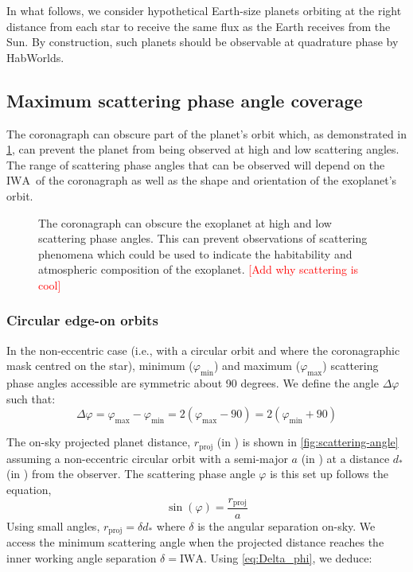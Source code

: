 \documentclass[
    usenatbib,
]{mnras}
\newcommand{\todo}[1]{\textcolor{red}{[#1]}}
\newcommand{\IWA}{\ensuremath{\mathrm{IWA}}}
\begin{document}
In what follows, we consider hypothetical Earth-size planets orbiting at the right distance from each star to receive the same flux as the Earth receives from the Sun. By construction, such planets should be observable at quadrature phase by HabWorlds. 


\subsection{Maximum scattering phase angle coverage}
\label{sec:Delta_phi}

The coronagraph can obscure part of the planet's orbit which, as demonstrated in \cref{fig:annotated-orbit}, can prevent the planet from being observed at high and low scattering angles. 
%
The range of scattering phase angles that can be observed will depend on the \IWA\ of the coronagraph as well as the shape and orientation of the exoplanet's orbit.

\begin{figure}
    \centering
    
    \caption{
        The coronagraph can obscure the exoplanet at high and low scattering phase angles. This can prevent observations of scattering phenomena which could be used to indicate the habitability and atmospheric composition of the exoplanet. \todo{Add why scattering is cool} 
    }
    \label{fig:annotated-orbit}
\end{figure}


\subsubsection{Circular edge-on orbits}

In the non-eccentric case (i.e., with a circular orbit and where the coronagraphic mask centred on the star), minimum ($\varphi_\mathrm{min}$) and maximum ($\varphi_\mathrm{max}$) scattering phase angles accessible are symmetric about 90 degrees. 
%
We define the angle $\Delta \varphi$ such that: 
\begin{equation}
    \label{eq:Delta_phi}
    \Delta \varphi 
    = \varphi_\mathrm{max} - \varphi_\mathrm{min}
    =  2(\varphi_\mathrm{max} - 90) 
    =  2(\varphi_\mathrm{min} + 90)
\end{equation}

The on-sky projected planet distance, $r_\mathrm{proj}$ (in \si{\au}) is shown in \cref{fig:scattering-angle} assuming a non-eccentric circular orbit with a semi-major $a$ (in \si{\au}) at a distance $d_*$ (in \si{\parsec}) from the observer. 
%
The scattering phase angle $\varphi$ is this set up follows the equation,
\begin{equation}
    \sin(\varphi) = \frac{r_\mathrm{proj}}{a}
\end{equation}
%
Using small angles, $r_\mathrm{proj} = \delta d_*$ where $\delta$ is the angular separation on-sky.
%
We access the minimum scattering angle when the projected distance reaches the inner working angle separation $\delta = \mathrm{IWA}$. 
%
Using \cref{eq:Delta_phi}, we deduce:
\end{document}
